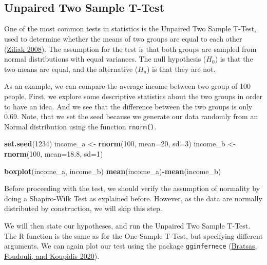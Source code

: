 \documentclass[
]{article}
\newenvironment{Shaded}{\begin{snugshade}}{\end{snugshade}}
\newcommand{\AttributeTok}[1]{\textcolor[rgb]{0.13,0.29,0.53}{#1}}
\newcommand{\DecValTok}[1]{\textcolor[rgb]{0.00,0.00,0.81}{#1}}
\newcommand{\FloatTok}[1]{\textcolor[rgb]{0.00,0.00,0.81}{#1}}
\newcommand{\FunctionTok}[1]{\textcolor[rgb]{0.13,0.29,0.53}{\textbf{#1}}}
\newcommand{\NormalTok}[1]{#1}
\newcommand{\OtherTok}[1]{\textcolor[rgb]{0.56,0.35,0.01}{#1}}
\newcommand{\SpecialCharTok}[1]{\textcolor[rgb]{0.81,0.36,0.00}{\textbf{#1}}}
\begin{document}
~

~

\hypertarget{unpaired-two-sample-t-test}{%
\subsection{Unpaired Two Sample T-Test}\label{unpaired-two-sample-t-test}}

One of the most common tests in statistics is the Unpaired Two Sample
T-Test, used to determine whether the means of two groups are equal to
each other (\protect\hyperlink{ref-ziliak2008}{Ziliak 2008}). The assumption for the test is that both
groups are sampled from normal distributions with equal variances. The
null hypothesis (\(H_0\)) is that the two means are equal, and the
alternative (\(H_a\)) is that they are not.

As an example, we can compare the average income between two group of
100 people. First, we explore some descriptive statistics about the two
groups in order to have an idea. And we see that the difference between
the two groups is only 0.69. Note, that we set the seed because we
generate our data randomly from an Normal distribution using the
function \texttt{rnorm()}.

\begin{Shaded}
\begin{Highlighting}[]
\FunctionTok{set.seed}\NormalTok{(}\DecValTok{1234}\NormalTok{)}
\NormalTok{income\_a }\OtherTok{\textless{}{-}} \FunctionTok{rnorm}\NormalTok{(}\DecValTok{100}\NormalTok{, }\AttributeTok{mean=}\DecValTok{20}\NormalTok{, }\AttributeTok{sd=}\DecValTok{3}\NormalTok{)}
\NormalTok{income\_b }\OtherTok{\textless{}{-}} \FunctionTok{rnorm}\NormalTok{(}\DecValTok{100}\NormalTok{, }\AttributeTok{mean=}\FloatTok{18.8}\NormalTok{, }\AttributeTok{sd=}\DecValTok{1}\NormalTok{)}

\FunctionTok{boxplot}\NormalTok{(income\_a, income\_b)}
\FunctionTok{mean}\NormalTok{(income\_a)}\SpecialCharTok{{-}}\FunctionTok{mean}\NormalTok{(income\_b)}
\end{Highlighting}
\end{Shaded}

Before proceeding with the test, we should verify the assumption of
normality by doing a Shapiro-Wilk Test as explained before. However, as
the data are normally distributed by construction, we will skip this
step.

We will then state our hypotheses, and run the Unpaired Two Sample
T-Test. The R function is the same as for the One-Sample T-Test, but
specifying different arguments. We can again plot our test using the
package \texttt{gginfernece} (\protect\hyperlink{ref-bratsas2020}{Bratsas, Foudouli, and Koupidis 2020}).
\end{document}
